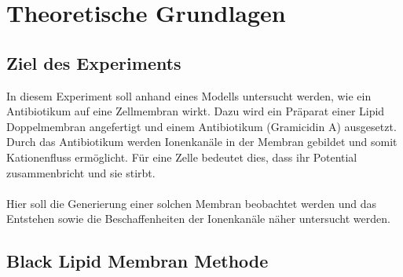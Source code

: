 \documentclass{include/thesisclass3}
\begin{document}
	\FrontMatter
	
	\tableofcontents                  
	\newpage
	\MainMatter


\chapter{Theoretische Grundlagen}
\section{Ziel des Experiments}
In diesem Experiment soll anhand eines Modells untersucht werden, wie ein Antibiotikum auf eine Zellmembran wirkt. Dazu wird ein Präparat einer Lipid Doppelmembran angefertigt und einem Antibiotikum (Gramicidin A) ausgesetzt. Durch das Antibiotikum werden Ionenkanäle in der Membran gebildet und somit Kationenfluss ermöglicht. Für eine Zelle bedeutet dies, dass ihr Potential zusammenbricht und sie stirbt.\\
\\
Hier soll die Generierung einer solchen Membran beobachtet werden und das Entstehen sowie die Beschaffenheiten der Ionenkanäle näher untersucht werden.


\section{Black Lipid Membran Methode}
\end{document}
